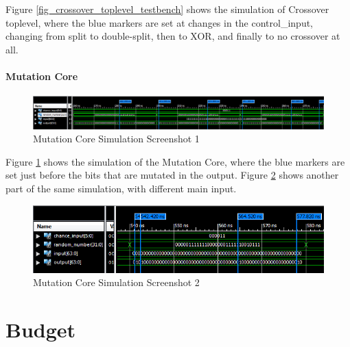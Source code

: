Figure \ref{fig_crossover_toplevel_testbench} shows the simulation of Crossover toplevel, where the blue markers are set at changes in the control\_input, changing from split to double-split, then to XOR, and finally to no crossover at all.

\subsubsection{Mutation Core}
\begin{figure}[H]
\includegraphics[width=\textwidth]{fpga/fig/testbenches/mutation_simulation1.png}
\caption{Mutation Core Simulation Screenshot 1}
\label{fig_mutation_testbench1}
\end{figure}

Figure \ref{fig_mutation_testbench1} shows the simulation of the Mutation Core, where the blue markers are set just before the bits that are mutated in the output.
Figure \ref{fig_mutation_testbench2} shows another part of the same simulation, with different main input.

\begin{figure}[H]
\includegraphics[width=\textwidth]{fpga/fig/testbenches/mutation_simulation2.png}
\caption{Mutation Core Simulation Screenshot 2}
\label{fig_mutation_testbench2}
\end{figure}


\chapter{Budget} \label{appendix:budget}
\newpage

